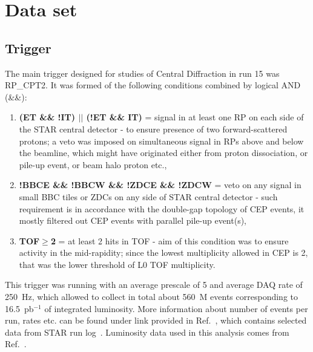 

\chapter{Data set}\label{chap:dataset}

\section{Trigger}\label{seq:trigger}

The main trigger designed for studies of Central Diffraction in run 15 was RP\_CPT2. It was formed of the following conditions combined by logical AND (\&\&):
\begin{enumerate}
 \item \textbf{(ET \&\& !IT) $||$ (!ET \&\& IT)} = signal in at least one RP on each side of the STAR central detector - to ensure presence of two forward-scattered protons; a veto was imposed on simultaneous signal in RPs above and below the beamline, which might have originated either from proton dissociation, or pile-up event, or beam halo proton etc.,
 \item \textbf{!BBCE \&\& !BBCW \&\& !ZDCE \&\& !ZDCW} = veto on any signal in small BBC tiles or ZDCs on any side of STAR central detector - such requirement is in accordance with the double-gap topology of CEP events, it mostly filtered out CEP events with parallel pile-up event(s),
 \item \textbf{TOF$\geq$2} = at least 2 hits in TOF - aim of this condition was to ensure activity in the mid-rapidity; since the lowest multiplicity allowed in CEP is 2, that was the lower threshold of L0 TOF multiplicity.
\end{enumerate}%
This trigger was running with an average prescale of 5 and average DAQ rate of 250~Hz, which allowed to collect in total about 560~M events corresponding to 16.5~pb$^{-1}$ of integrated luminosity.  More information about number of events per run, rates etc. can be found under link provided in Ref.~\cite{onlineRpTriggersMonitoring}, which contains selected data from STAR run log~\cite{RunLog}. Luminosity data used in this analysis comes from Ref.~\cite{Luminosity}.

